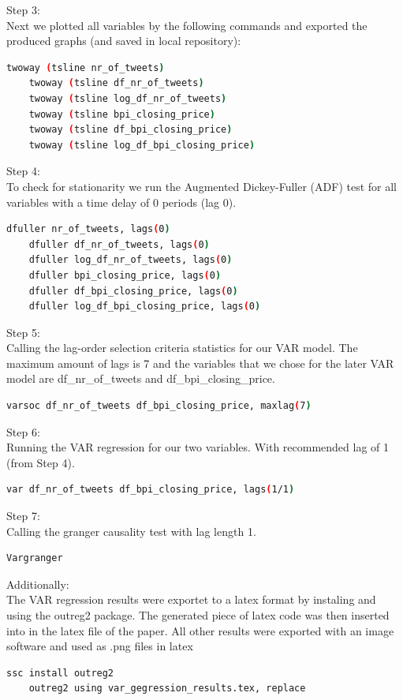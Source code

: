 \documentclass[a4paper,12pt]{article}
\begin{document}
\begin{spacing}{1.2}
Step 3:\\
Next we plotted all variables by the following commands and exported the produced graphs (and saved in local repository):\\
	\begin{lstlisting}[language=bash]
	twoway (tsline nr_of_tweets)
	twoway (tsline df_nr_of_tweets)
	twoway (tsline log_df_nr_of_tweets)
	twoway (tsline bpi_closing_price)
	twoway (tsline df_bpi_closing_price)
	twoway (tsline log_df_bpi_closing_price)
	\end{lstlisting}

Step 4:\\
To check for stationarity we run the Augmented Dickey-Fuller (ADF) test for all variables with a time delay of 0 periods (lag 0).\\
	\begin{lstlisting}[language=bash]
	dfuller nr_of_tweets, lags(0)
	dfuller df_nr_of_tweets, lags(0)
	dfuller log_df_nr_of_tweets, lags(0)
	dfuller bpi_closing_price, lags(0)
	dfuller df_bpi_closing_price, lags(0)
	dfuller log_df_bpi_closing_price, lags(0)
	\end{lstlisting}

Step 5:\\
Calling the lag-order selection criteria statistics for our VAR model. The maximum amount of lags is 7 and the variables that we chose for the later VAR model are df\_nr\_of\_tweets and df\_bpi\_closing\_price.\\
	\begin{lstlisting}[language=bash]
	varsoc df_nr_of_tweets df_bpi_closing_price, maxlag(7)
	\end{lstlisting}

Step 6:\\
Running the VAR regression for our two variables. With recommended lag of 1 (from Step 4).\\
	\begin{lstlisting}[language=bash]
	var df_nr_of_tweets df_bpi_closing_price, lags(1/1)
	\end{lstlisting}

Step 7:\\
Calling the granger causality test with lag length 1.\\
	\begin{lstlisting}[language=bash]
	Vargranger
	\end{lstlisting}

Additionally:\\
The VAR regression results were exportet to a latex format by instaling and using the outreg2 package. The generated piece of latex code was then inserted into in the latex file of the paper. All other results were exported with an image software and used as .png files in latex\\
	\begin{lstlisting}[language=bash]
	ssc install outreg2
	outreg2 using var_gegression_results.tex, replace
	\end{lstlisting}

\end{spacing}
\clearpage
\end{document}

